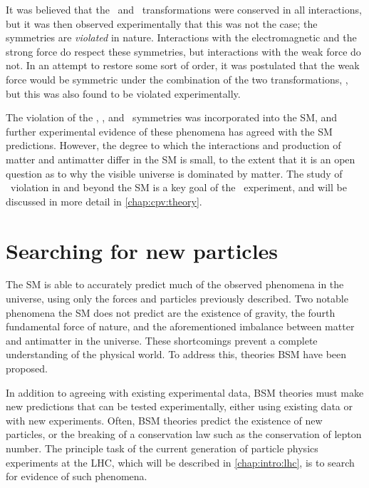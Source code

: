 It was believed that the \Ctransform\ and \Ptransform\ transformations were 
conserved in all interactions, but it was then observed experimentally that 
this was not the case; the symmetries are \emph{violated} in nature.
Interactions with the electromagnetic and the strong force do respect these 
symmetries, but interactions with the weak force do not.
In an attempt to restore some sort of order, it was postulated that the weak 
force would be symmetric under the combination of the two transformations, \CP, 
but this was also found to be violated experimentally.

The violation of the \Ctransform, \Ptransform, and \CP\ symmetries was 
incorporated into the \ac{SM}, and further experimental evidence of these 
phenomena has agreed with the \ac{SM} predictions.
However, the degree to which the interactions and production of matter and 
antimatter differ in the \ac{SM} is small, to the extent that it is an open 
question as to why the visible universe is dominated by matter.
The study of \CP\ violation in and beyond the \ac{SM} is a key goal of the 
\lhcb\ experiment, and will be discussed in more detail in 
\cref{chap:cpv:theory}.

\section{Searching for new particles}

The \acl{SM} is able to accurately predict much of the observed phenomena in 
the universe, using only the forces and particles previously described.
Two notable phenomena the \ac{SM} does not predict are the existence of 
gravity, the fourth fundamental force of nature, and the aforementioned 
imbalance between matter and antimatter in the universe.
These shortcomings prevent a complete understanding of the physical world.
To address this, theories \acf{BSM} have been proposed.


In addition to agreeing with existing experimental data, \ac{BSM} theories must 
make new predictions that can be tested experimentally, either using existing 
data or with new experiments.
Often, \ac{BSM} theories predict the existence of new particles, or the 
breaking of a conservation law such as the conservation of lepton number.
The principle task of the current generation of particle physics experiments at 
the \acl{LHC}, which will be described in \cref{chap:intro:lhc}, is to search 
for evidence of such phenomena.

